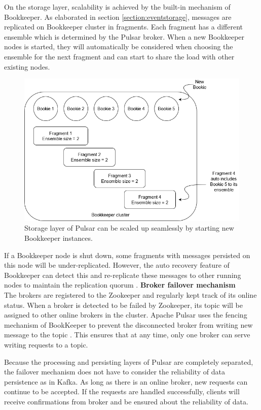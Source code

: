 On the storage layer, scalability is achieved by the built-in mechanism of Bookkeeper. As elaborated in section \ref{section:eventstorage}, messages are replicated on Bookkeeper cluster in fragments. Each fragment has a different ensemble which is determined by the Pulsar broker. When a new Bookkeeper nodes is started, they will automatically be considered when choosing the ensemble for the next fragment and can start to share the load with other existing nodes. 
\begin{figure}[h]
	\centering
	\includegraphics[width=\linewidth]{images/scalability-pulsar.png}
	\caption{Storage layer of Pulsar can be scaled up seamlessly by starting new Bookkeeper instances.}
	\label{fig:scalabilitypulsar}
\end{figure}

If a Bookkeeper node is shut down, some fragments with messages persisted on this node will be under-replicated. However, the auto recovery feature of Bookkeeper can detect this and re-replicate these messages to other running nodes to maintain the replication quorum \cite{bookkeeperadmin}.
\newpage
\textbf{Broker failover mechanism}\\
The brokers are registered to the Zookeeper and regularly kept track of its online status. When a broker is detected to be failed by Zookeeper, its topic will be assigned to other online brokers in the cluster. Apache Pulsar uses the fencing mechanism of BookKeeper to prevent the disconnected broker from writing new message to the topic \cite{bookkeeperprotocol}. This ensures that at any time, only one broker can serve writing requests to a topic.

Because the processing and persisting layers of Pulsar are completely separated, the failover mechanism does not have to consider the reliability of data persistence as in Kafka. As long as there is an online broker, new requests can continue to be accepted. If the requests are handled successfully, clients will receive confirmations from broker and be ensured about the reliability of data. 

